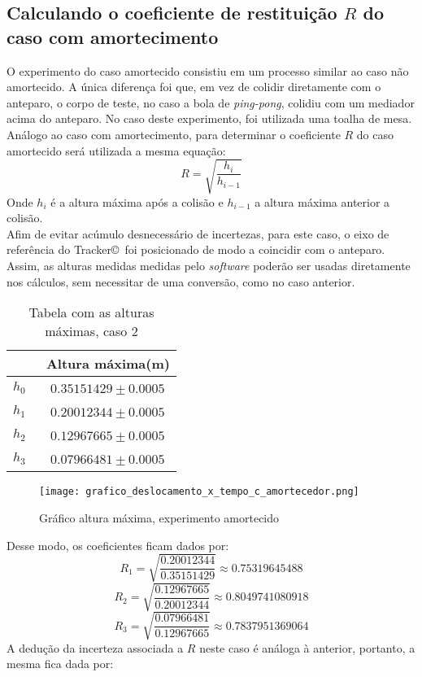 \documentclass[a4paper, 12pt]{article}
\begin{document}
		\subsection{Calculando o coeficiente de restituição $R$ do caso com amortecimento}
		O experimento do caso amortecido consistiu em um processo similar ao caso não amortecido. A única diferença foi que, em vez de colidir diretamente com o anteparo, o corpo de teste, no caso a bola de \textsl{ping-pong}, colidiu com um mediador acima do anteparo. No caso deste experimento, foi utilizada uma toalha de mesa.		
		Análogo ao caso com amortecimento, para determinar o coeficiente $R$ do caso amortecido será utilizada a mesma equação: 
		$$R= \sqrt{\dfrac{h_i}{h_{i-1}}}$$
		Onde  $h_i$ é a altura máxima após a colisão e $h_{i-1}$ a altura máxima anterior a colisão.\\
		Afim de evitar acúmulo desnecessário de incertezas, para este caso, o eixo de referência do Tracker\copyright \, foi posicionado de modo a coincidir com o anteparo. Assim, as alturas medidas medidas pelo \textsl{software} poderão ser usadas diretamente nos cálculos, sem necessitar de uma conversão, como no caso anterior.
		\begin{table}[H]
			\centering
			\begin{tabular}{c|c}
				\hline \,  & \ Altura máxima(m) \\
				\hline $h_0$ & \ $0.35151429 \pm 0.0005$ \\
				\hline $h_1$ & \ $0.20012344 \pm 0.0005$\\
				\hline $h_2$ & \ $0.12967665 \pm 0.0005$\\
				\hline $h_3$ & \ $0.07966481 \pm 0.0005$\\
				\hline
			\end{tabular}	
			\caption{Tabela com as alturas máximas, caso 2}
			\label{tcm}		
		\end{table}
		\begin{figure}[htb]
			\centering
			\texttt{[image: grafico\_deslocamento\_x\_tempo\_c\_amortecedor.png]}
			\caption{Gráfico altura máxima, experimento amortecido}
			\label{g1}
		\end{figure}
		\newpage		
		\noindent Desse modo, os coeficientes ficam dados por:
		$$R_1 = \sqrt{\dfrac{0.20012344}{0.35151429}} \approx 0.75319645488$$
		$$R_2 = \sqrt{\dfrac{0.12967665}{0.20012344}} \approx 0.8049741080918$$
		$$R_3 = \sqrt{\dfrac{0.07966481}{0.12967665}} \approx 0.7837951369064$$		
		A dedução da incerteza associada a $R$ neste caso é análoga à anterior, portanto, a mesma fica dada por:
\end{document}
